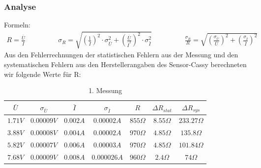 \documentclass[12pt,a4paper]{article}
\begin{document}
\subsubsection{Analyse}
Formeln:
\begin{align*}
R=\frac{\bar{U}}{\bar{I}} \hspace{2cm} 
\sigma_R=\sqrt{(\frac{1}{\bar{I}})^{2} \cdot \sigma_{\bar{U}}^{2}+(\frac{\bar{U}}{\bar{I}^2})^{2} \cdot \sigma_{\bar{I}}^{2}} \hspace{2cm}\frac{\sigma_R}{R}=\sqrt{(\frac{\sigma_{\bar{U}}}{\bar{U}})^2+(\frac{\sigma_{\bar{I}}}{\bar{I}})^2}
\end{align*}
Aus den Fehlerrechnungen der statistischen Fehlern aus der Messung und den systematischen Fehlern aus den Herstellerangaben des Sensor-Cassy berechneten wir folgende Werte für R:
\begin{table}[H]\centering
\caption{1. Messung}
\begin{tabular}{c|c|c|c|c|c|c}
$\bar{U}$& $\sigma_{\bar{U}}$& $\bar{I}$& $\sigma_{\bar{I}}$& $R$& $\Delta R_{stat}$& $\Delta R_{sys}$ \\ \hline
$1.71V$& $0.00009V$& $0.002A$& $0.00002A$& $855\Omega$& $8.55\Omega$& $233.27\Omega$\\ 
$3.88V$& $0.00008V$& $0.004A$& $0.00002A$& $970\Omega$& $4.85\Omega$& $135.8\Omega$\\ 
$5.82V$& $0.00007V$& $0.006A$& $0.00003A$& $970\Omega$& $4.85\Omega$& $101.84\Omega$ \\
$7.68V$& $0.00009V$& $0.008A$& $0.000026A$& $960\Omega$& $2.4\Omega$& $74\Omega$ \\
\end{tabular} 
\end{table}
\end{document}
